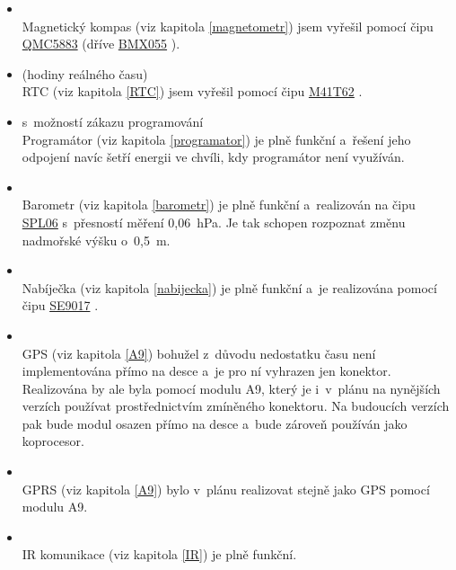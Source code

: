 \begin{itemize}
    \item {} \\ Magnetický kompas (viz kapitola \ref{magnetometr}) jsem vyřešil pomocí čipu \href{https://datasheet.lcsc.com/szlcsc/QST-QMC5883L-TR_C192585.pdf}{QMC5883} \parencite{qmc5883} (dříve \href{https://datasheet.lcsc.com/szlcsc/Bosch-Sensortec-BMX055_C94022.pdf}{BMX055} \parencite{bmx055}).
    \item {} (hodiny reálného času) \\ RTC (viz kapitola \ref{RTC}) jsem vyřešil pomocí čipu 
        \href{https://datasheet.lcsc.com/szlcsc/STMicroelectronics-M41T62Q6F_C113207.pdf}{M41T62} \parencite{m41t62}.
    \item {} s~možností zákazu programování
        \\ Programátor (viz kapitola \ref{programator}) je plně funkční a~řešení jeho odpojení navíc šetří energii ve chvíli, kdy programátor není využíván.
    \item {} \\ Barometr (viz kapitola \ref{barometr}) je plně funkční a~realizován na čipu 
    \href{https://datasheet.lcsc.com/szlcsc/1907081118_Goertek-SPL06-007_C233787.pdf}{SPL06} s~přesností měření 
            0,06~hPa. Je tak schopen rozpoznat změnu nadmořské výšku o~0,5~m.
    \item {} \\ Nabíječka (viz kapitola \ref{nabijecka}) je plně funkční a~je realizována pomocí čipu \href{https://datasheet.lcsc.com/szlcsc/Seaward-Elec-SE9017-HF_C115752.pdf}{SE9017} \parencite{se9017}.
    \item {} \\ GPS (viz kapitola \ref{A9}) bohužel z~důvodu nedostatku času není implementována přímo na desce a~je pro ní vyhrazen jen konektor. 
            Realizována by ale byla pomocí modulu A9, který 
            je i~v~plánu na nynějších verzích používat prostřednictvím zmíněného konektoru. 
            Na budoucích verzích pak bude modul osazen přímo na desce a~bude zároveň používán jako koprocesor.
    \item {} \\ GPRS (viz kapitola \ref{A9}) bylo v~plánu realizovat stejně jako GPS pomocí modulu A9.
    \item {} \\ IR komunikace (viz kapitola \ref{IR}) je plně funkční.
\end{itemize}

